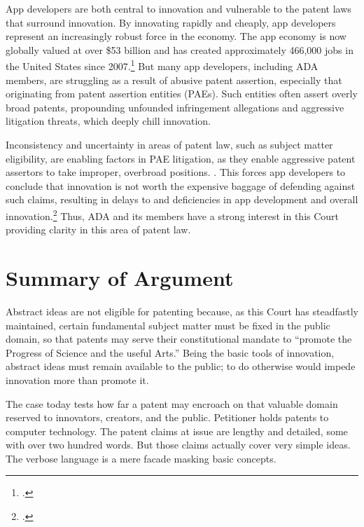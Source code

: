 \documentclass{scotus}
\begin{document}
App developers are both central to innovation and vulnerable to the patent laws
that surround innovation. By innovating rapidly and cheaply, app developers
represent an increasingly robust force in the economy. The app economy is now
globally valued at over \$53 billion and has
created approximately 466,000 jobs in the United States since
2007.\footnote{.} But many app developers,
including
ADA members, are struggling as a result of abusive patent assertion, especially
that originating from patent assertion entities (PAEs). Such entities often
assert overly broad patents, propounding unfounded infringement allegations and
aggressive litigation threats, which deeply chill innovation.

Inconsistency and uncertainty in areas of patent law, such as subject matter
eligibility, are enabling factors in PAE litigation, as they enable aggressive
patent assertors to take improper, overbroad positions.
. This forces
app developers to conclude that innovation is not worth the expensive baggage of
defending against such claims, resulting in delays to and deficiencies in app
development and overall innovation.\footnote{.} Thus,
ADA and its members have a strong interest in this Court providing clarity in
this area of patent law.




\clearpage

\part{Summary of Argument}

Abstract ideas are not eligible for patenting because, as this Court has
steadfastly maintained, certain fundamental subject matter must be fixed in the
public domain, so that patents may serve their constitutional mandate to
``promote the Progress of Science and the useful Arts.'' Being the basic tools
of innovation, abstract ideas must remain available to the public; to do
otherwise would impede innovation more than promote it.

The case today tests how far a patent may encroach on that valuable domain
reserved to innovators, creators, and the public. Petitioner holds patents
to computer technology. The patent claims at issue are
lengthy and detailed, some with over two hundred words. But those claims
actually cover very simple ideas. The verbose language is a mere facade
masking basic concepts.
\end{document}
